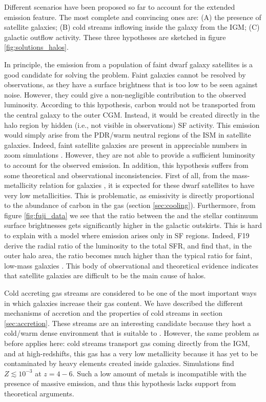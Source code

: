 Different scenarios have been proposed so far to account for the extended \CII emission feature. The most complete and convincing ones are: (A) the presence of satellite galaxies; (B) cold streams inflowing inside the galaxy from the IGM; (C) galactic outflow activity. These three hypotheses are sketched in figure \ref{fig:solutions_halos}.

In principle, the emission from a population of faint dwarf galaxy satellites is a good candidate for solving the problem. Faint galaxies cannot be resolved by observations, as they have a surface brightness that is too low to be seen against noise. However, they could give a non-negligible contribution to the observed \CII luminosity. According to this hypothesis, carbon would not be transported from the central galaxy to the outer CGM. Instead, it would be created directly in the halo region by hidden (i.e., not visible in observations) SF activity. This \CII emission would simply arise from the PDR/warm neutral regions of the ISM in satellite galaxies. Indeed, faint satellite galaxies are present in appreciable numbers in zoom simulations \citep[e.g.,][]{pallottini:2019}. However, they are not able to provide a sufficient luminosity to account for the observed \CII emission. In addition, this hypothesis suffers from some theoretical and observational inconsistencies. First of all, from the mass-metallicity relation for galaxies \citep{mannucci:2012}, it is expected for these dwarf satellites to have very low metallicities. This is problematic, as \CII emissivity is directly proportional to the abundance of carbon in the gas (section \ref{sec:cooling}). Furthermore, from figure \ref{fig:fuji_data} we see that the ratio between the \CII and the stellar continuum surface brightnesses gets significantly higher in the galactic outskirts. This is hard to explain with a model where \CII emission arises only in SF regions. Indeed, F19 \citep{Fujimoto19} derive the radial ratio of the \CII luminosity to the total SFR, and find that, in the outer halo area, the ratio becomes much higher than the typical ratio for faint, low-mass galaxies \citep{diaz_santos}. This body of observational and theoretical evidence indicates that satellite galaxies are difficult to be the main cause of \CII halos.


Cold accreting gas streams are considered to be one of the most important ways in which galaxies increase their gas content. We have described the different mechanisms of accretion and the properties of cold streams in section \ref{sec:accretion}. These streams are an interesting candidate because they host a cold/warm dense environment that is suitable to \CIIion. However, the same problem as before applies here: cold streams transport gas coming directly from the IGM, and at high-redshifts, this gas has a very low metallicity because it has yet to be contaminated by heavy elements created inside galaxies. Simulations \citep[e.g.,][]{pallottini2014} find $Z\lesssim 10^{-3}$ at $z=4-6$. Such a low amount of metals is incompatible with the presence of massive \CII emission, and thus this hypothesis lacks support from theoretical arguments.


